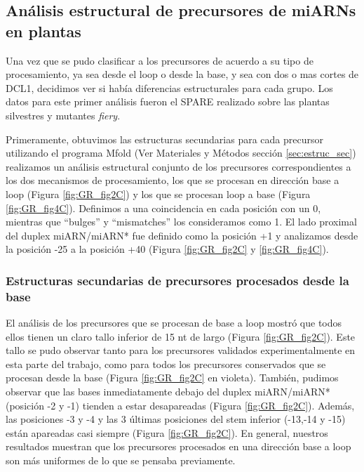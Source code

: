 \subsection{Análisis estructural de precursores de miARNs en plantas}

Una vez que se pudo clasificar a los precursores de acuerdo a su tipo de procesamiento, ya sea desde el loop o desde la base, y sea con dos o mas cortes de DCL1, decidimos ver si había diferencias estructurales para cada grupo.
Los datos para este primer análisis fueron el SPARE realizado sobre las plantas silvestres y mutantes \textit{fiery}.

Primeramente, obtuvimos las estructuras secundarias para cada precursor  utilizando el programa Mfold\citep{pmid12824337} (Ver Materiales y Métodos sección \ref{sec:estruc_sec}) realizamos un análisis estructural conjunto de los precursores correspondientes a los dos mecanismos de procesamiento, los que se procesan en dirección base a loop (Figura \ref{fig:GR_fig2C}) y los que se procesan loop a base (Figura \ref{fig:GR_fig4C}).
Definimos a una coincidencia en cada posición con un 0, mientras que ``bulges'' y ``mismatches'' los consideramos como 1.
El lado proximal del duplex miARN/miARN* fue definido como la posición +1 y analizamos desde la posición -25 a la posición +40 (Figura \ref{fig:GR_fig2C} y \ref{fig:GR_fig4C}). 

\subsubsection{Estructuras secundarias de precursores procesados desde la base}

El análisis de los precursores que se procesan de base a loop mostró que todos ellos tienen un claro tallo inferior de 15 nt de largo (Figura \ref{fig:GR_fig2C}).
Este tallo se pudo observar tanto para los precursores validados experimentalmente en esta parte del trabajo, como para todos los precursores conservados que se procesan desde la base (Figura \ref{fig:GR_fig2C} en violeta).
También, pudimos observar que las bases inmediatamente debajo del duplex miARN/miARN* (posición -2 y -1) tienden a estar desapareadas (Figura \ref{fig:GR_fig2C}).
Además, las posiciones -3 y -4 y las 3 últimas posiciones del stem inferior (-13,-14 y -15) están apareadas casi siempre (Figura \ref{fig:GR_fig2C}).
En general, nuestros resultados muestran que los precursores procesados en una dirección base a loop son más uniformes de lo que se pensaba previamente.

